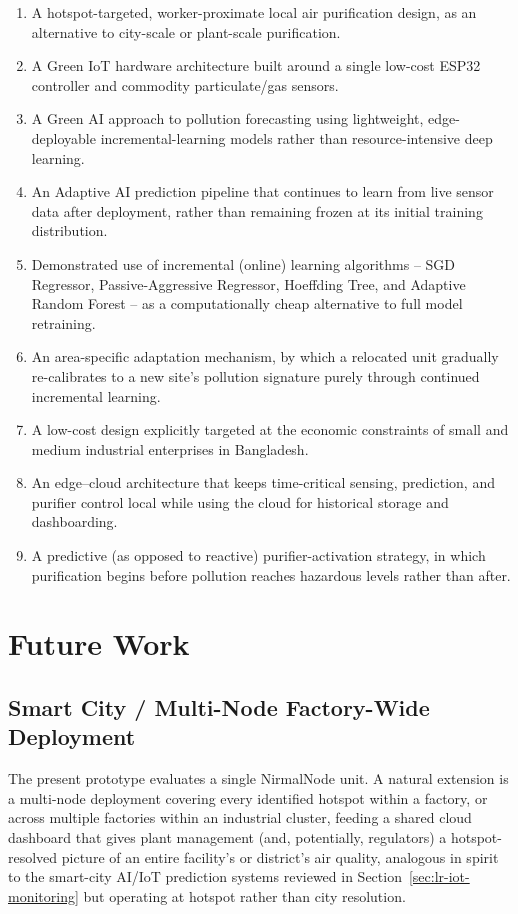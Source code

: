 \begin{enumerate}
    \item A hotspot-targeted, worker-proximate local air purification design, as an alternative to city-scale or plant-scale purification.
    \item A Green IoT hardware architecture built around a single low-cost ESP32 controller and commodity particulate/gas sensors.
    \item A Green AI approach to pollution forecasting using lightweight, edge-deployable incremental-learning models rather than resource-intensive deep learning.
    \item An Adaptive AI prediction pipeline that continues to learn from live sensor data after deployment, rather than remaining frozen at its initial training distribution.
    \item Demonstrated use of incremental (online) learning algorithms -- SGD Regressor, Passive-Aggressive Regressor, Hoeffding Tree, and Adaptive Random Forest -- as a computationally cheap alternative to full model retraining.
    \item An area-specific adaptation mechanism, by which a relocated unit gradually re-calibrates to a new site's pollution signature purely through continued incremental learning.
    \item A low-cost design explicitly targeted at the economic constraints of small and medium industrial enterprises in Bangladesh.
    \item An edge--cloud architecture that keeps time-critical sensing, prediction, and purifier control local while using the cloud for historical storage and dashboarding.
    \item A predictive (as opposed to reactive) purifier-activation strategy, in which purification begins before pollution reaches hazardous levels rather than after.
\end{enumerate}

\section{Future Work}
\label{sec:conc-future-work}

\subsection{Smart City / Multi-Node Factory-Wide Deployment}
\label{sec:future-smartcity}
The present prototype evaluates a single NirmalNode unit. A natural extension is a multi-node deployment covering every identified hotspot within a factory, or across multiple factories within an industrial cluster, feeding a shared cloud dashboard that gives plant management (and, potentially, regulators) a hotspot-resolved picture of an entire facility's or district's air quality, analogous in spirit to the smart-city AI/IoT prediction systems reviewed in Section~\ref{sec:lr-iot-monitoring} but operating at hotspot rather than city resolution.

